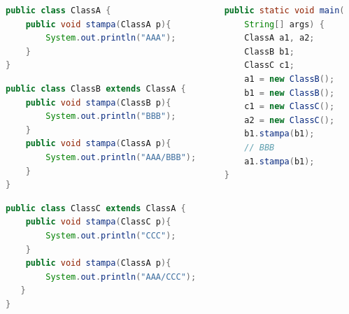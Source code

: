 \documentclass{beamer}
\begin{document}
\begin{frame}[fragile]
\begin{columns}
\begin{column}{0.6\textwidth}
\begin{lstlisting}[language=Java,escapechar=|]
public class ClassA {
    public void stampa(ClassA p){
        System.out.println("AAA");
    }
}
\end{lstlisting}
\begin{lstlisting}[language=Java,escapechar=|]
public class ClassB extends ClassA {
    public void stampa(ClassB p){
        System.out.println("BBB");
    }
    public void stampa(ClassA p){
        System.out.println("AAA/BBB");
    }
}
\end{lstlisting}
\begin{lstlisting}[language=Java,escapechar=|]
public class ClassC extends ClassA {
    public void stampa(ClassC p){
        System.out.println("CCC");
    }
    public void stampa(ClassA p){
        System.out.println("AAA/CCC");
   }
}
\end{lstlisting}
\end{column}
\begin{column}{0.4\textwidth}
\begin{lstlisting}[language=Java,escapechar=|]
public static void main(
    String[] args) {
    ClassA a1, a2;
    ClassB b1;
    ClassC c1;
    a1 = new ClassB();
    b1 = new ClassB();
    c1 = new ClassC();
    a2 = new ClassC();
    b1.stampa(b1); 
    // BBB
    a1.stampa(b1); 
}
\end{lstlisting}
\end{column}
\end{columns}
\end{frame}
\end{document}

